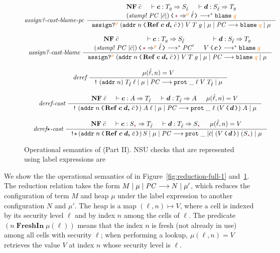 \begin{figure}[tbp]
{\begin{gather*}
  \textit{assign?-cast-blame-pc}~
  \inference{\mathbf{NF}\;\bar{c} & \vdash \bm{c} : T_g \Rightarrow S_{\hat{\ell}} & \vdash \bm{d} : S_{\hat{\ell}} \Rightarrow T_g \\ \cccast{(\mathit{stamp!}\;\PC\;|\bar{c}|)}{\unk \Rightarrow^{\bl{p}} \hat{\ell}} \longrightarrow^{*} \blame{q}}
  {\reduce{\ccassignproj{\left(\cccast{\ccaddr{n}}{\coerc{\refco{\bm{c}}{\bm{d}}}{\bar{c}}}\right)}{V}{T}{g}{p}}{\mu}{\PC}{\blame{q}}{\mu}}
  \\[2ex]
  \textit{assign?-cast-blame}~
  \inference{\mathbf{NF}\;\bar{c} & \vdash \bm{c} : T_g \Rightarrow S_{\hat{\ell}} & \vdash \bm{d} : S_{\hat{\ell}} \Rightarrow T_g \\ \cccast{(\mathit{stamp!}\;\PC\;|\bar{c}|)}{\unk \Rightarrow^{\bl{p}} \hat{\ell}} \longrightarrow^{*} \PC' & \cccast{V}{\bm{c}} \longrightarrow^{*} \blame{q}}
  {\reduce{\ccassignproj{\left(\cccast{\ccaddr{n}}{\coerc{\refco{\bm{c}}{\bm{d}}}{\bar{c}}}\right)}{V}{T}{g}{p}}{\mu}{\PC}{\blame{q}}{\mu}}
  \\[2ex]
  \textit{deref}~
  \inference{\mu(\hat{\ell}, n) = V}
  {\reduce{\ccderef{(\ccaddr{n})}{T_{\hat{\ell}}}{\ell}}{\mu}{\PC}{\ccprot{\_}{\ell}{V}{T_{\hat{\ell}}}}{\mu}}
  \\[2ex]
  \textit{deref-cast}~
  \inference{\mathbf{NF}\;\bar{c} & \vdash \bm{c} : A \Rightarrow T_{\hat{\ell}} & \vdash \bm{d} : T_{\hat{\ell}} \Rightarrow A & \mu(\hat{\ell}, n) = V}
  {\reduce{\ccderef{\left(\cccast{\ccaddr{n}}{\coerc{\refco{\bm{c}}{\bm{d}}}{\bar{c}}}\right)}{A}{\ell}}{\mu}{\PC}{\ccprot{\_}{\ell}{(\cccast{V}{\bm{d}})}{A}}{\mu}}
  \\[2ex]
  \textit{deref}{\star}\textit{-cast}~
  \inference{\mathbf{NF}\;\bar{c} & \vdash \bm{c} : S_{\unk} \Rightarrow T_{\hat{\ell}} & \vdash \bm{d} : T_{\hat{\ell}} \Rightarrow S_{\unk} & \mu(\hat{\ell}, n) = V}
  {\reduce{\ccderefstar{\left(\cccast{\ccaddr{n}}{\coerc{\refco{\bm{c}}{\bm{d}}}{\bar{c}}}\right)}{S}}{\mu}{\PC}{\ccprot{\_}{|\bar{c}|}{(\cccast{V}{\bm{d}})}{(S_{\unk})}}{\mu}}
  \end{gather*}}
  \caption{Operational semantics of \CC (Part II). NSU checks that are
    represented using label expressions are }
  \label{fig:reduction-full-2}
\end{figure}

We show the the operational semantics of \CC in
Figure~\ref{fig:reduction-full-1} and~\ref{fig:reduction-full-2}. The reduction
relation takes the form ${M}\mid{\mu}\mid{\ensuremath{\mathit{PC}}}\longrightarrow{N}\mid{\mu'}$, which reduces the
configuration of term $M$ and heap $\mu$ under the label expression \PC to
another configuration $N$ and $\mu'$. The heap is a map $(\ell, n) \mapsto V$,
where a cell is indexed by its security level $\ell$ and by index $n$ among the
cells of $\ell$. The predicate $(n\;\mathbf{FreshIn}\;\mu(\ell))$ means that the
index $n$ is fresh (not already in use) among all cells with security $\ell$;
when performing a lookup, $\mu(\ell, n) = V$ retrieves the value $V$ at index
$n$ whose security level is $\ell$.

